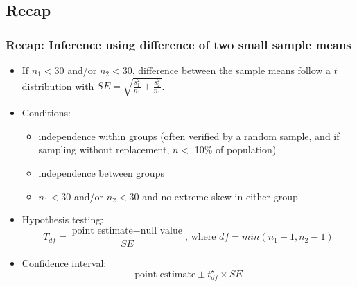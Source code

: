 \subsection{Recap}


\begin{frame}
\frametitle{Recap: Inference using difference of two small sample means}

\begin{itemize}

\item If $n_1 < 30$ and/or $n_2 < 30$, difference between the sample means follow a $t$ distribution with $SE = \sqrt{ \frac{s_1^2}{n_1} + \frac{s_2^2}{n_1} }$.

\pause

\item Conditions: 
\begin{itemize}
\item independence within groups (often verified by a random sample, and if sampling without replacement, $n < $ 10\% of population)
\item independence between groups
\item  $n_1 < 30$ and/or $n_2 < 30$ and no extreme skew in either group
\end{itemize}

\pause

\item Hypothesis testing: 
\[ T_{df} = \frac{\text{point estimate} - \text{null value}}{SE}\text{, where }df = min(n_1 - 1, n_2 - 1) \]

\pause

\item Confidence interval:
\[ \text{point estimate} \pm t_{df}^\star \times SE \]

\end{itemize}

\end{frame}

